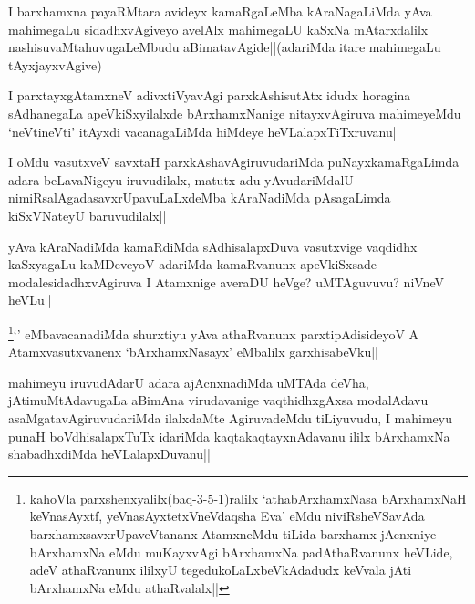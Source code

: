 
\begin{artha}
I barxhamxna payaRMtara avideyx kamaRgaLeMba kAraNagaLiMda yAva mahimegaLu sidadhxvAgiveyo avelAlx mahimegaLU kaSxNa mAtarxdalilx nashisuvaMtahuvugaLeMbudu aBimatavAgide||(adariMda itare mahimegaLu tAyxjayxvAgive)
\end{artha}

\begin{artha}
I parxtayxgAtamxneV adivxtiVyavAgi parxkAshisutAtx idudx horagina sAdhanegaLa apeVkiSxyilalxde bArxhamxNanige nitayxvAgiruva mahimeyeMdu `neVtineVti' itAyxdi vacanagaLiMda hiMdeye heVLalapxTiTxruvanu||
\end{artha}

\begin{artha}
I oMdu vasutxveV savxtaH parxkAshavAgiruvudariMda puNayxkamaRgaLimda adara beLavaNigeyu iruvudilalx, matutx adu yAvudariMdalU nimiRsalAgadasavxrUpavuLaLxdeMba kAraNadiMda pAsagaLimda kiSxVNateyU baruvudilalx||
\end{artha}



\begin{artha}
yAva kAraNadiMda kamaRdiMda sAdhisalapxDuva vasutxvige vaqdidhx kaSxyagaLu kaMDeveyoV adariMda kamaRvanunx apeVkiSxsade modalesidadhxvAgiruva I Atamxnige averaDU heVge? uMTAguvuvu? niVneV heVLu||
\end{artha}


\begin{artha}
\footnote{kahoVla parxshenxyalilx(baq-3-5-1)ralilx `athabArxhamxNasa bArxhamxNaH keVnasAyxtf, yeVnasAyxtetxVneVdaqsha Eva' eMdu niviRsheVSavAda barxhamxsavxrUpaveVtananx AtamxneMdu tiLida barxhamx jAcnxniye bArxhamxNa eMdu muKayxvAgi bArxhamxNa padAthaRvanunx heVLide, adeV athaRvanunx ililxyU tegedukoLaLxbeVkAdadudx keVvala jAti bArxhamxNa eMdu athaRvalalx||}`\stext' eMbavacanadiMda shurxtiyu yAva athaRvanunx parxtipAdisideyoV A Atamxvasutxvanenx `bArxhamxNasayx' eMbalilx garxhisabeVku||
\end{artha}


\begin{artha}
mahimeyu iruvudAdarU adara ajAcnxnadiMda uMTAda deVha, jAtimuMtAdavugaLa aBimAna virudavanige vaqthidhxgAxsa modalAdavu asaMgatavAgiruvudariMda ilalxdaMte AgiruvadeMdu tiLiyuvudu, I mahimeyu punaH boVdhisalapxTuTx idariMda kaqtakaqtayxnAdavanu ililx bArxhamxNa shabadhxdiMda heVLalapxDuvanu||
\end{artha}

